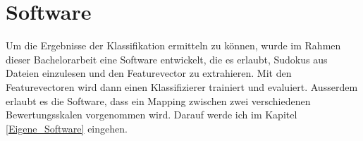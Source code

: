 \chapter{Software}
Um die Ergebnisse der Klassifikation ermitteln zu können, wurde im Rahmen dieser Bachelorarbeit eine Software entwickelt, die es erlaubt, Sudokus aus Dateien einzulesen und den Featurevector zu extrahieren. Mit den Featurevectoren wird dann einen Klassifizierer trainiert und evaluiert. Ausserdem erlaubt es die Software, dass ein Mapping zwischen zwei verschiedenen Bewertungsskalen vorgenommen wird. Darauf werde ich im Kapitel \ref{Eigene_Software} eingehen.